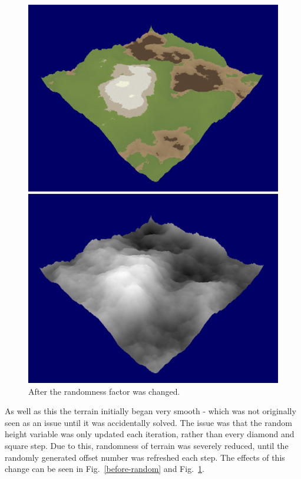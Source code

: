 \documentclass[a4paper,10pt]{report}
\begin{document}
\begin{figure}[h!]
\centering
\begin{minipage}{.4\textwidth}
  \centering
  \includegraphics[width=.9\linewidth]{Images/Sprint-Images/Sprint-7-After-Colour.png}
\end{minipage}
\begin{minipage}{.4\textwidth}
  \centering
  \includegraphics[width=.9\linewidth]{Images/Sprint-Images/Sprint-7-After-Greyscale.png}
\end{minipage}
\caption{After the randomness factor was changed.}
\label{after-random}
\end{figure}


As well as this the terrain initially began very smooth - which was not originally seen as an issue until it was accidentally solved. The issue was that the random height variable was only updated each iteration, rather than every diamond and square step. Due to this, randomness of terrain was severely reduced, until the randomly generated offset number was refreshed each step. The effects of this change can be seen in Fig.~\ref{before-random} and Fig.~\ref{after-random}.
\end{document}
